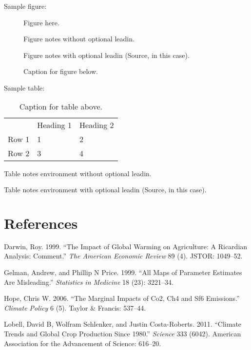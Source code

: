 \documentclass[AER]{AEA}
\begin{document}
Sample figure:

\begin{figure}
Figure here.

\caption{Caption for figure below.}
\begin{figurenotes}
Figure notes without optional leadin.
\end{figurenotes}
\begin{figurenotes}[Source]
Figure notes with optional leadin (Source, in this case).
\end{figurenotes}
\end{figure}

Sample table:

\begin{table}
\caption{Caption for table above.}

\begin{tabular}{lll}
& Heading 1 & Heading 2 \\
Row 1 & 1 & 2 \\
Row 2 & 3 & 4%
\end{tabular}
\begin{tablenotes}
Table notes environment without optional leadin.
\end{tablenotes}
\begin{tablenotes}[Source]
Table notes environment with optional leadin (Source, in this case).
\end{tablenotes}
\end{table}

\section*{References}\label{references}

\hypertarget{refs}{}
\hypertarget{ref-Darwin1999}{}
Darwin, Roy. 1999. ``The Impact of Global Warming on Agriculture: A
Ricardian Analysis: Comment.'' \emph{The American Economic Review} 89
(4). JSTOR: 1049--52.

\hypertarget{ref-GelmanPrice1999}{}
Gelman, Andrew, and Phillip N Price. 1999. ``All Maps of Parameter
Estimates Are Misleading.'' \emph{Statistics in Medicine} 18 (23):
3221--34.

\hypertarget{ref-Hope2006}{}
Hope, Chris W. 2006. ``The Marginal Impacts of Co2, Ch4 and Sf6
Emissions.'' \emph{Climate Policy} 6 (5). Taylor \& Francis: 537--44.

\hypertarget{ref-LobellSchlenkerCosta-Roberts2011}{}
Lobell, David B, Wolfram Schlenker, and Justin Costa-Roberts. 2011.
``Climate Trends and Global Crop Production Since 1980.'' \emph{Science}
333 (6042). American Association for the Advancement of Science:
616--20.
\end{document}
